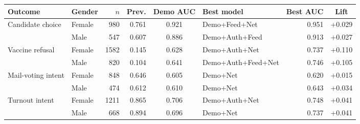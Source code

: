 \begin{tabular}{llrrclrc}
\toprule
Outcome & Gender & $n$ & Prev. & Demo AUC & Best model & Best AUC & Lift \\
\midrule
Candidate choice & Female & 980 & 0.761 & 0.921 & Demo+Feed+Net & 0.951 & +0.029 \\
 & Male & 547 & 0.607 & 0.886 & Demo+Auth+Feed & 0.913 & +0.027 \\
Vaccine refusal & Female & 1582 & 0.145 & 0.628 & Demo+Auth+Net & 0.737 & +0.110 \\
 & Male & 820 & 0.104 & 0.641 & Demo+Auth+Feed+Net & 0.746 & +0.105 \\
Mail-voting intent & Female & 848 & 0.646 & 0.605 & Demo+Net & 0.620 & +0.015 \\
 & Male & 474 & 0.612 & 0.610 & Demo+Net & 0.643 & +0.034 \\
Turnout intent & Female & 1211 & 0.865 & 0.706 & Demo+Auth+Net & 0.748 & +0.041 \\
 & Male & 668 & 0.894 & 0.696 & Demo+Net & 0.737 & +0.041 \\
\bottomrule
\end{tabular}